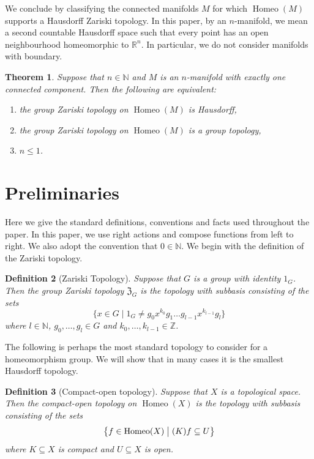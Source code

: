\documentclass[11pt]{amsart}
\makeatletter
\newtheorem{theorem}{Theorem}[section]
\newtheorem{definition}[theorem]{Definition}
\newcommand{\N}{\mathbb N}
\newcommand{\Z}{\mathbb Z}
\newcommand{\makeset}[2]{\left\lbrace #1 \;\middle|\;
 \begin{tabular}{@{}l@{}}
   #2
  \end{tabular}
  \right\rbrace}
\makeatother
\begin{document}
 We conclude by classifying the connected manifolds $M$ for which $\operatorname{Homeo}(M)$ supports a Hausdorff Zariski topology.
In this paper, by an \(n\)-manifold, we mean a second countable Hausdorff space such that every point has an open neighbourhood homeomorphic to \(\mathbb{R}^n\). In particular, we do not consider manifolds with boundary.
\begin{theorem}\label{mainManifold}
    Suppose that \(n\in \N\) and \(M\) is an \(n\)-manifold with exactly one connected component. Then the following are equivalent:
    \begin{enumerate}
        \item the group Zariski topology on \(\operatorname{Homeo}(M)\) is Hausdorff,
        \item the group Zariski topology on \(\operatorname{Homeo}(M)\) is a group topology,
        \item \(n\leq 1\).
    \end{enumerate}
\end{theorem}

\section{Preliminaries}
Here we give the standard definitions, conventions and facts used throughout the paper.
In this paper, we use right actions and compose functions from left to right. We also adopt the convention that \(0\in \N\).
We begin with the definition of the Zariski topology.
\begin{definition}[Zariski Topology]\label{zariskidef}
    Suppose that \(G\) is a group with identity \(1_G\). Then the group Zariski topology \(\mathfrak{Z}_G\) is the topology with subbasis consisting of the sets
    \[\{x \in G \mid 1_G \neq g_0 x^{k_0} g_1 \dots g_{l-1} x^{k_{l-1}} g_l\}\]
    where \(l\in \N\), \(g_0,\ldots,g_{l}\in G\) and \(k_0,\ldots, k_{l-1}\in \Z\).
\end{definition}

The following is perhaps the most standard topology to consider for a homeomorphism group. We will show that in many cases it is the smallest Hausdorff topology.

\begin{definition}[Compact-open topology]
Suppose that \(X\) is a topological space. Then the compact-open topology on \(\operatorname{Homeo}(X)\) is the topology with subbasis consisting of the sets
\[\makeset{f\in \operatorname{Homeo}(X)}{\((K)f\subseteq U\)}\]
where \(K\subseteq X\) is compact and \(U\subseteq X\) is open.
\end{definition}
\end{document}
